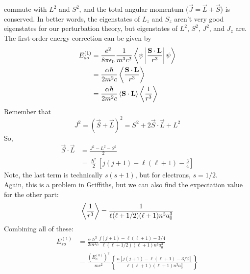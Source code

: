 \documentclass[a4paper]{article}
\begin{document}
commute with $L^2$ and $S^2$, and the total angular momentum
($\vec{J} = \vec{L} + \vec{S}$) is conserved. In better words, the eigenstates
of $L_z$ and $S_z$ aren't very good eigenstates for our perturbation theory,
but eigenstates of $L^2$, $S^2$, $J^2$, and $J_z$ are.\\
The first-order energy correction can be given by
\begin{align*}
	E_{so}^{(1)} &= \frac{e^2}{8\pi\epsilon_0}\frac{1}{m^3c^2}
		\left\langle \psi \left\vert \frac{\boldsymbol{\mathbf{S}}\cdot\boldsymbol{\mathbf{L}}}{r^3} \right\vert \psi \right\rangle\\
		&= \frac{\alpha\hslash}{2m^2c}
			\left\langle \frac{\boldsymbol{\mathbf{S}}\cdot\boldsymbol{\mathbf{L}}}{r^3}\right\rangle\\
		&= \frac{\alpha\hslash}{2m^2c}
			\left\langle \boldsymbol{\mathbf{S}}\cdot\boldsymbol{\mathbf{L}}\right\rangle
			\left\langle \frac{1}{r^3}\right\rangle
\end{align*}
Remember that
\[ J^2 = (\vec{S}+\vec{L})^2 = S^2 + 2\vec{S}\cdot\vec{L} + L^2 \]
So,
\begin{align*}
	\vec{S}\cdot\vec{L} &= \frac{J^2-L^2-S^2}{2}\\
	&= \frac{\hslash^2}{2}\left[j(j+1) - \ell(\ell+1) - \frac{3}{4}\right]
\end{align*}
Note, the last term is technically $s(s+1)$, but for electrons, $s=1/2$.\\
Again, this is a problem in Griffiths, but we can also find the expectation
value for the other part:
\[ \left\langle \frac{1}{r^3}\right\rangle = \frac{1}{\ell(\ell+1/2)(\ell+1)n^3a_0^3} \]
Combining all of these:
\begin{align*}
	E_{so}^{(1)} &= \frac{\alpha\hslash^3}{2m^2c}
	\frac{j(j+1)-\ell(\ell+1)-3/4}{\ell(\ell+1/2)(\ell+1)n^3a_0^3}\\
	&= \frac{\left(E_n^{(0)}\right)^2}{mc^2}
	\left\{\frac{n[j(j+1)-\ell(\ell+1)-3/2]}
	{\ell(\ell+1)(\ell+1)n^3a_0^3}\right\}
\end{align*}
\end{document}
